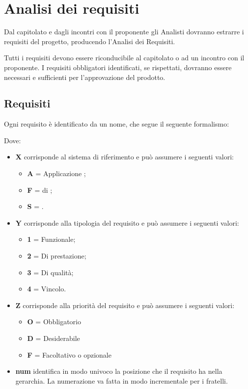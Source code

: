 \section{Analisi dei requisiti}

Dal capitolato e dagli incontri con il proponente gli Analisti dovranno estrarre i requisiti del progetto, producendo l'Analisi dei Requisiti.

Tutti i requisiti devono essere riconducibile al capitolato o ad un incontro con il proponente. I requisiti obbligatori identificati, se rispettati, dovranno essere necessari e sufficienti per l'approvazione del prodotto.

\subsection{Requisiti}

Ogni requisito è identificato da un nome, che segue il seguente formalismo:
\begin{center}
\end{center}

Dove:
\begin{itemize}
 \item \textbf{X} corrisponde al sistema di riferimento e può assumere i seguenti valori:
	\begin{itemize}
	 \item[] \textbf{A} = Applicazione ;
	 \item[] \textbf{F} =  di ;
	 \item[] \textbf{S} = .
	\end{itemize}

 \item \textbf{Y} corrisponde alla tipologia del requisito e può assumere i seguenti valori:
	\begin{itemize}
	 \item[] \textbf{1} = Funzionale;
	 \item[] \textbf{2} = Di prestazione;
	 \item[] \textbf{3} = Di qualità;
	 \item[] \textbf{4} = Vincolo.
	\end{itemize}

 \item \textbf{Z} corrisponde alla priorità del requisito e può assumere i seguenti valori:
	\begin{itemize}
	 \item[] \textbf{O} = Obbligatorio
	 \item[] \textbf{D} = Desiderabile
	 \item[] \textbf{F} = Facoltativo o opzionale
	\end{itemize}

 \item \textbf{num} identifica in modo univoco la posizione che il requisito ha nella gerarchia. La numerazione va fatta in modo incrementale per i fratelli. %
\end{itemize}

